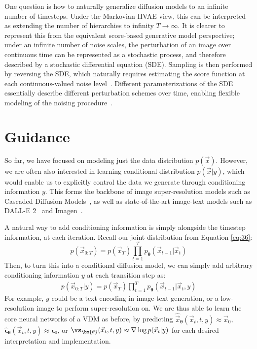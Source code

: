 One question is how to naturally generalize diffusion models to an infinite number of timesteps.  Under the Markovian HVAE view, this can be interpreted as extending the number of hierarchies to infinity $T \rightarrow \infty$.  It is clearer to represent this from the equivalent score-based generative model perspective; under an infinite number of noise scales, the perturbation of an image over continuous time can be represented as a stochastic process, and therefore described by a stochastic differential equation (SDE).  Sampling is then performed by reversing the SDE, which naturally requires estimating the score function at each continuous-valued noise level~\cite{song2020score}.  Different parameterizations of the SDE essentially describe different perturbation schemes over time, enabling flexible modeling of the noising procedure~\cite{kingma2021variational}.

\section*{Guidance}
%
So far, we have focused on modeling just the data distribution $p(\vec{x})$.  However, we are often also interested in learning conditional distribution $p(\vec{x}|y)$, which would enable us to explicitly control the data we generate through conditioning information $y$.  This forms the backbone of image super-resolution models such as Cascaded Diffusion Models~\cite{ho2022cascaded}, as well as state-of-the-art image-text models such as DALL-E 2~\cite{ramesh2022hierarchical} and Imagen~\cite{saharia2022photorealistic}.

A natural way to add conditioning information is simply alongside the timestep information, at each iteration.  Recall our joint distribution from Equation \ref{eq:36}:
$$p(\vec{x}_{0:T}) = p(\vec{x}_T)\prod_{t=1}^Tp_{\bm{\theta}}(\vec{x}_{t-1}|\vec{x}_t)$$
Then, to turn this into a conditional diffusion model, we can simply add arbitrary conditioning information $y$ at each transition step as:
\begin{align}
p(\vec{x}_{0:T}|y) = p(\vec{x}_T)\prod_{t=1}^Tp_{\bm{\theta}}(\vec{x}_{t-1}|\vec{x}_t, y)
\end{align}
For example, $y$ could be a text encoding in image-text generation, or a low-resolution image to perform super-resolution on.  We are thus able to learn the core neural networks of a VDM as before, by predicting $\hat \vec{x}_{\bm{\theta}}(\vec{x}_t, t, y) \approx \vec{x}_0$, $\bm{\hat\epsilon}_{\bm{\theta}}(\vec{x}_t, t, y) \approx \bm{\epsilon}_0$, or $\vs_{\bm{\theta}}(\vec{x}_t, t, y) \approx \nabla\log p(\vec{x}_t|y)$ for each desired interpretation and implementation.

